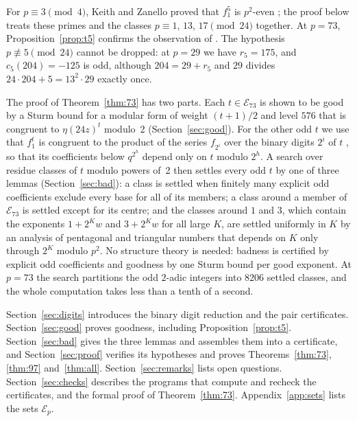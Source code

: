 \documentclass[12pt]{amsart}
\theoremstyle{definition}
\newcommand{\cE}{\mathcal{E}}
\newcommand{\computed}[2]{\ignorespaces}
\newcommand{\mapitem}[1]{\ignorespaces}
\begin{document}
For $p\equiv3\pmod4$, Keith and Zanello proved that $f_1^5$ is $p^2$-even \cite[Theorem~19 with $a=b=1$, $e=2$]{KZ3}; the proof below treats these primes and the classes $p\equiv1$, $13$, $17\pmod{24}$ together. At $p=73$, Proposition~\ref{prop:t5} confirms the observation of \cite[Remark~35]{KZ3}. The hypothesis $p\not\equiv5\pmod{24}$ cannot be dropped: at $p=29$ we have $r_5=175$, and $c_5(204)=-125$ is odd, although $204=29+r_5$ and $29$ divides $24\cdot204+5=13^2\cdot29$ exactly once.
\mapitem{Section~\ref{sec:intro}, the value $c_5(204)$ at $p=29$}
\computed{gp -q paper/small_checks.gp, part 3}{paper/small_checks.out}

The proof of Theorem~\ref{thm:73} has two parts. Each $t\in\cE_{73}$ is shown to be good by a Sturm bound for a modular form of weight $(t+1)/2$ and level $576$ that is congruent to $\eta(24z)^t$ modulo~2 (Section~\ref{sec:good}). For the other odd $t$ we use that $f_1^t$ is congruent to the product of the series $f_{2^i}$ over the binary digits $2^i$ of $t$ \cite[Section~1.2]{KZ3}, so that its coefficients below $q^{2^h}$ depend only on $t$ modulo $2^h$. A search over residue classes of $t$ modulo powers of~2 then settles every odd $t$ by one of three lemmas (Section~\ref{sec:bad}): a class is settled when finitely many explicit odd coefficients exclude every base for all of its members; a class around a member of $\cE_{73}$ is settled except for its centre; and the classes around $1$ and $3$, which contain the exponents $1+2^Kw$ and $3+2^Kw$ for all large $K$, are settled uniformly in $K$ by an analysis of pentagonal and triangular numbers that depends on $K$ only through $2^K$ modulo $p^2$. No structure theory is needed: badness is certified by explicit odd coefficients and goodness by one Sturm bound per good exponent. At $p=73$ the search partitions the odd $2$-adic integers into $8206$ settled classes, and the whole computation takes less than a tenth of a second.

Section~\ref{sec:digits} introduces the binary digit reduction and the pair certificates. Section~\ref{sec:good} proves goodness, including Proposition~\ref{prop:t5}. Section~\ref{sec:bad} gives the three lemmas and assembles them into a certificate, and Section~\ref{sec:proof} verifies its hypotheses and proves Theorems~\ref{thm:73}, \ref{thm:97} and~\ref{thm:all}. Section~\ref{sec:remarks} lists open questions. Section~\ref{sec:checks} describes the programs that compute and recheck the certificates, and the formal proof of Theorem~\ref{thm:73}. Appendix~\ref{app:sets} lists the sets $\cE_p$.
\end{document}
